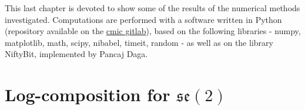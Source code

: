 This last chapter is devoted to show some of the results of the numerical methods investigated.
Computations are performed with a software written in Python (repository available on the \href{https://cmiclab.cs.ucl.ac.uk}{cmic gitlab}), based on 
the following libraries - numpy, matplotlib, math, scipy, nibabel, timeit, random - as well as on the library NiftyBit, implemented by Pancaj Daga.

\section{Log-composition for $\mathfrak{se}(2)$}

